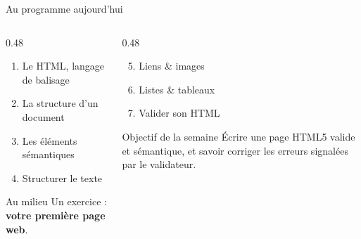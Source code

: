 \documentclass[aspectratio=169,11pt]{beamer}
\begin{document}
\begin{frame}{Au programme aujourd'hui}
  \begin{columns}[T]
    \begin{column}{0.48\textwidth}
      \begin{enumerate}
        \item Le HTML, langage de balisage
        \item La structure d'un document
        \item Les éléments sémantiques
        \item Structurer le texte
      \end{enumerate}
      \vspace{0.25cm}
      \begin{exampleblock}{Au milieu}
        Un exercice : \textbf{votre première page web}.
      \end{exampleblock}
    \end{column}
    \begin{column}{0.48\textwidth}
      \begin{enumerate}
        \setcounter{enumi}{4}
        \item Liens \& images
        \item Listes \& tableaux
        \item Valider son HTML
      \end{enumerate}
      \vspace{0.25cm}
      \begin{block}{Objectif de la semaine}
        Écrire une page HTML5 valide et sémantique, et savoir corriger les erreurs signalées par le validateur.
      \end{block}
    \end{column}
  \end{columns}
\end{frame}
\end{document}

